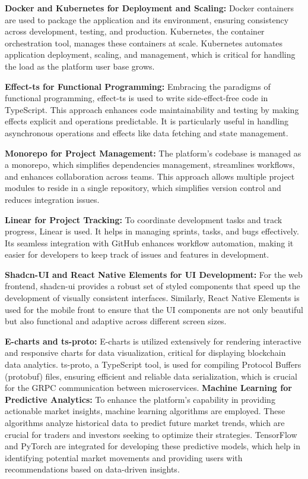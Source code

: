 \documentclass[12pt]{report}
\begin{document}
\textbf{Docker and Kubernetes for Deployment and Scaling:} Docker containers are used to package the application and its environment, ensuring consistency across development, testing, and production. Kubernetes, the container orchestration tool, manages these containers at scale. Kubernetes automates application deployment, scaling, and management, which is critical for handling the load as the platform user base grows.

\textbf{Effect-ts for Functional Programming:} Embracing the paradigms of functional programming, effect-ts is used to write side-effect-free code in TypeScript. This approach enhances code maintainability and testing by making effects explicit and operations predictable. It is particularly useful in handling asynchronous operations and effects like data fetching and state management.

\textbf{Monorepo for Project Management:} The platform's codebase is managed as a monorepo, which simplifies dependencies management, streamlines workflows, and enhances collaboration across teams. This approach allows multiple project modules to reside in a single repository, which simplifies version control and reduces integration issues.

\textbf{Linear for Project Tracking:} To coordinate development tasks and track progress, Linear is used. It helps in managing sprints, tasks, and bugs effectively. Its seamless integration with GitHub enhances workflow automation, making it easier for developers to keep track of issues and features in development.

\textbf{Shadcn-UI and React Native Elements for UI Development:} For the web frontend, shadcn-ui provides a robust set of styled components that speed up the development of visually consistent interfaces. Similarly, React Native Elements is used for the mobile front to ensure that the UI components are not only beautiful but also functional and adaptive across different screen sizes.

\textbf{E-charts and ts-proto:} E-charts is utilized extensively for rendering interactive and responsive charts for data visualization, critical for displaying blockchain data analytics. ts-proto, a TypeScript tool, is used for compiling Protocol Buffers (protobuf) files, ensuring efficient and reliable data serialization, which is crucial for the GRPC communication between microservices.
\textbf{Machine Learning for Predictive Analytics:} To enhance the platform's capability in providing actionable market insights, machine learning algorithms are employed. These algorithms analyze historical data to predict future market trends, which are crucial for traders and investors seeking to optimize their strategies. TensorFlow and PyTorch are integrated for developing these predictive models, which help in identifying potential market movements and providing users with recommendations based on data-driven insights.
\end{document}

